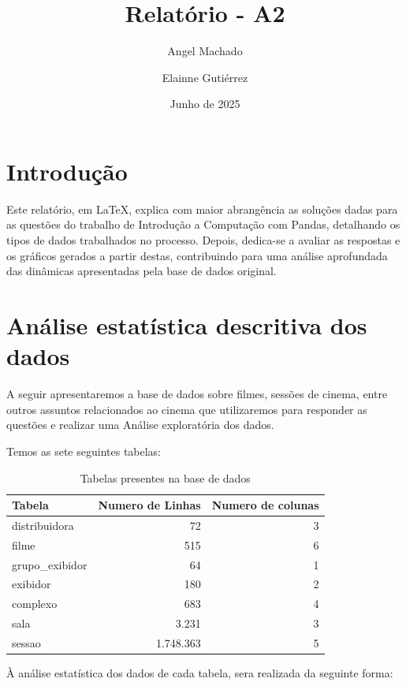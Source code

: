 \documentclass[12pt, a4paper]{article}
\title{Relatório - A2}
\author{Angel Machado \and Elainne Gutiérrez}
\date{Junho de 2025}
\begin{document}
\maketitle

\tableofcontents

\section{Introdução}
Este relatório, em \LaTeX, explica com maior abrangência as soluções dadas para as questões do trabalho de Introdução a Computação com Pandas, detalhando os tipos de dados trabalhados no processo. Depois, dedica-se a avaliar as respostas e os gráficos gerados a partir destas, contribuindo para uma análise aprofundada das dinâmicas apresentadas pela base de dados original.

\newpage
\section{Análise estatística descritiva dos dados}
A seguir apresentaremos a base de dados sobre filmes, sessões de cinema, entre outros assuntos relacionados ao cinema que utilizaremos para responder as questões e realizar uma Análise exploratória dos dados.

Temos as sete seguintes tabelas:

\begin{table}[h]
    \centering
    \begin{tabular}{l|r|r}
        Tabela       &  Numero de Linhas& Numero de colunas\\
         \hline
        distribuidora   & 72 & 3\\            
        filme	        & 515 & 6\\        
        grupo\_exibidor & 64 & 1\\           
        exibidor        & 180 & 2\\ 
        \hline
        complexo        & 683 & 4\\
        sala            & 3.231 & 3\\
        sessao          & 1.748.363 & 5\\
    \end{tabular}
    \caption{Tabelas presentes na base de dados}
    \label{tab:Tabelas das bases de dados}
\end{table}

À análise estatística dos dados de cada tabela, sera realizada da seguinte forma:
\end{document}

